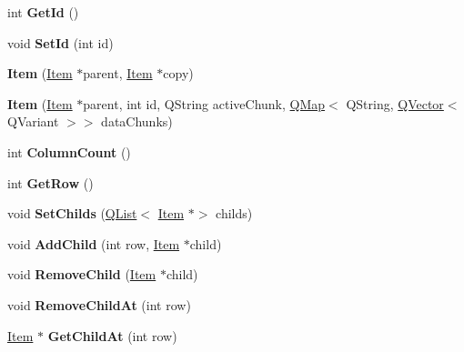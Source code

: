 \begin{DoxyCompactItemize}
int {\bfseries Get\+Id} ()
\item 
\mbox{\label{class_item_a46a50959228845fc8d4c1a1e3cdfc9a3}} 
void {\bfseries Set\+Id} (int id)
\item 
\mbox{\label{class_item_aef96722ef425ab3794691db85ba4abd6}} 
{\bfseries Item} (\hyperlink{class_item}{Item} $\ast$parent, \hyperlink{class_item}{Item} $\ast$copy)
\item 
\mbox{\label{class_item_a27fb96423d6e35b384b226bc3408b348}} 
{\bfseries Item} (\hyperlink{class_item}{Item} $\ast$parent, int id, Q\+String active\+Chunk, \hyperlink{class_q_map}{Q\+Map}$<$ Q\+String, \hyperlink{class_q_vector}{Q\+Vector}$<$ Q\+Variant $>$$>$ data\+Chunks)
\item 
\mbox{\label{class_item_ae09610bc79b15b17cce0428661b14a88}} 
int {\bfseries Column\+Count} ()
\item 
\mbox{\label{class_item_adad3b372e59e9b033d3f8dc371fac651}} 
int {\bfseries Get\+Row} ()
\item 
\mbox{\label{class_item_a279eb94495d56f33e8779f1de7110681}} 
void {\bfseries Set\+Childs} (\hyperlink{class_q_list}{Q\+List}$<$ \hyperlink{class_item}{Item} $\ast$$>$ childs)
\item 
\mbox{\label{class_item_a6a98cb08e94548f37614132f663f5dfb}} 
void {\bfseries Add\+Child} (int row, \hyperlink{class_item}{Item} $\ast$child)
\item 
\mbox{\label{class_item_ab77ee89c1d573571d46276904ddea022}} 
void {\bfseries Remove\+Child} (\hyperlink{class_item}{Item} $\ast$child)
\item 
\mbox{\label{class_item_a88f43c96e836f5a1473763fd0e8846bb}} 
void {\bfseries Remove\+Child\+At} (int row)
\item 
\mbox{\label{class_item_a80ac5f26c6d125de147b2c5aae8631c7}} 
\hyperlink{class_item}{Item} $\ast$ {\bfseries Get\+Child\+At} (int row)
\item 
\mbox{\label{class_item_a9324d6e789340e65394bea357954e6e1}} 

\end{DoxyCompactItemize}
